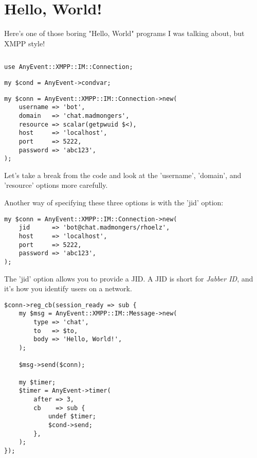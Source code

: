 \section{Hello, World!}

\pause

Here's one of those boring "Hello, World" programs I was talking about, but XMPP style!

\begin{shaded}
\inputminted{perl}{examples/hello.pl}
\end{shaded}
\pause

\begin{shaded}
\begin{verbatim}
use AnyEvent::XMPP::IM::Connection;
\end{verbatim}
\end{shaded}

\pause
\begin{shaded}
\begin{verbatim}
my $cond = AnyEvent->condvar;
\end{verbatim}
\end{shaded}

\newpage
\begin{shaded}
\begin{verbatim}
my $conn = AnyEvent::XMPP::IM::Connection->new(
    username => 'bot',
    domain   => 'chat.madmongers',
    resource => scalar(getpwuid $<),
    host     => 'localhost',
    port     => 5222,
    password => 'abc123',
);
\end{verbatim}
\end{shaded}

\pause
Let's take a break from the code and look at the 'username', 'domain', and
'resource' options more carefully.

\pause
Another way of specifying these three options is with the 'jid' option:

\begin{shaded}
\begin{verbatim}
my $conn = AnyEvent::XMPP::IM::Connection->new(
    jid      => 'bot@chat.madmongers/rhoelz',
    host     => 'localhost',
    port     => 5222,
    password => 'abc123',
);
\end{verbatim}
\end{shaded}

\pause
The 'jid' option allows you to provide a JID.  A JID is short for \textit{Jabber ID}, and it's how
you identify users on a network.

\pause
\begin{shaded}
\begin{verbatim}
$conn->reg_cb(session_ready => sub {
    my $msg = AnyEvent::XMPP::IM::Message->new(
        type => 'chat',
        to   => $to,
        body => 'Hello, World!',
    );

    $msg->send($conn);

    my $timer;
    $timer = AnyEvent->timer(
        after => 3,
        cb    => sub {
            undef $timer;
            $cond->send;
        },
    );
});
\end{verbatim}
\end{shaded}

